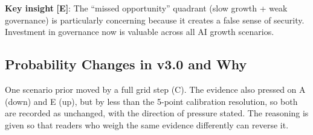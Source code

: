 \documentclass[11pt,letterpaper]{article}
\begin{document}
\textbf{Key insight} \textbf{[E]}: The ``missed opportunity'' quadrant (slow growth + weak governance) is particularly concerning because it creates a false sense of security. Investment in governance now is valuable across all AI growth scenarios.

\subsection{Probability Changes in v3.0 and Why}

One scenario prior moved by a full grid step (C). The evidence also pressed on A (down) and E (up), but by less than the 5-point calibration resolution, so both are recorded as unchanged, with the direction of pressure stated. The reasoning is given so that readers who weigh the same evidence differently can reverse it.
\end{document}
